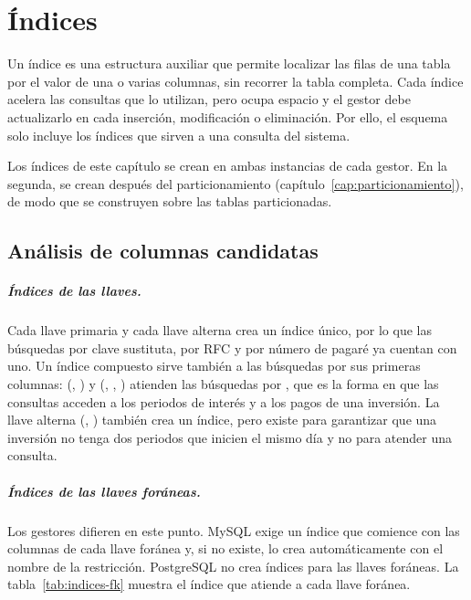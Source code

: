 \chapter{Índices}
\label{cap:indices}

Un índice es una estructura auxiliar que permite localizar las filas de una tabla por el valor de una o varias columnas, sin recorrer la tabla completa. Cada índice acelera las consultas que lo utilizan, pero ocupa espacio y el gestor debe actualizarlo en cada inserción, modificación o eliminación. Por ello, el esquema solo incluye los índices que sirven a una consulta del sistema.

Los índices de este capítulo se crean en ambas instancias de cada gestor. En la segunda, se crean después del particionamiento (capítulo~\ref{cap:particionamiento}), de modo que se construyen sobre las tablas particionadas.

\section{Análisis de columnas candidatas}

\paragraph{Índices de las llaves.} Cada llave primaria y cada llave alterna crea un índice único, por lo que las búsquedas por clave sustituta, por RFC y por número de pagaré ya cuentan con uno. Un índice compuesto sirve también a las búsquedas por sus primeras columnas:  (, ) y  (, , ) atienden las búsquedas por , que es la forma en que las consultas acceden a los periodos de interés y a los pagos de una inversión. La llave alterna  (, ) tambi\'en crea un índice, pero existe para garantizar que una inversión no tenga dos periodos que inicien el mismo día y no para atender una consulta.

\paragraph{Índices de las llaves foráneas.} Los gestores difieren en este punto. MySQL exige un índice que comience con las columnas de cada llave foránea y, si no existe, lo crea automáticamente con el nombre de la restricción. PostgreSQL no crea índices para las llaves foráneas. La tabla~\ref{tab:indices-fk} muestra el índice que atiende a cada llave foránea.


